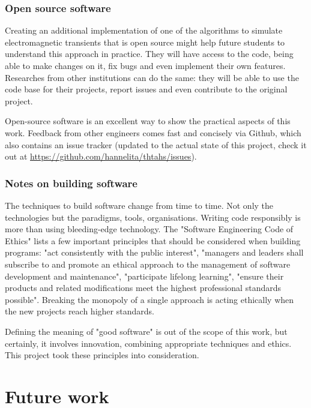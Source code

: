 \subsubsection{Open source software}

Creating an additional implementation of one of the algorithms to simulate electromagnetic transients that is open source might help future students to understand this approach in practice. They will have access to the code, being able to make changes on it, fix bugs and even implement their own features.   Researches from other institutions can do the same: they will be able to use the code base for their projects, report issues and even contribute to the original project.

Open-source software is an excellent way to show the practical aspects of this work. Feedback from other engineers comes fast and concisely via Github, which also contains an issue tracker (updated to the actual state of this project, check it out at \url{https://github.com/hannelita/thtahs/issues}).

\subsubsection{Notes on building software}

The techniques to build software change from time to time. Not only the technologies but the paradigms,  tools, organisations. Writing code responsibly is more than using bleeding-edge technology. The "Software Engineering Code of Ethics" \cite{gotterbarn1999software} lists a few important principles that should be considered when building programs: "act consistently with the public interest", "managers and leaders shall subscribe to and promote an ethical approach to the management of software development and maintenance", "participate lifelong learning", "ensure their products and related modifications meet the highest professional standards possible". Breaking the monopoly of a single approach is acting ethically when the new projects reach higher standards.

Defining the meaning of "good software" is out of the scope of this work, but certainly, it involves innovation, combining appropriate techniques and ethics. This project took these principles into consideration.  


\section{Future work}

